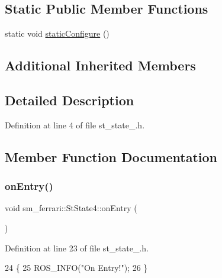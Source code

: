 \subsection*{Static Public Member Functions}
\begin{DoxyCompactItemize}
\item 
static void \hyperlink{structsm__ferrari_1_1StState4_a1b12da24983fb4162bfc1791a91f4fd4}{static\+Configure} ()
\end{DoxyCompactItemize}
\subsection*{Additional Inherited Members}


\subsection{Detailed Description}


Definition at line 4 of file st\+\_\+state\+\_.\+h.



\subsection{Member Function Documentation}
\mbox{\label{structsm__ferrari_1_1StState4_a03b9f1557aada256d6c5ce4a241ca8a6}} 
\subsubsection{\texorpdfstring{on\+Entry()}{onEntry()}}
{\footnotesize\ttfamily void sm\+\_\+ferrari\+::\+St\+State4\+::on\+Entry (\begin{DoxyParamCaption}{ }\end{DoxyParamCaption})\hspace{0.3cm}{\ttfamily [inline]}}



Definition at line 23 of file st\+\_\+state\+\_.\+h.


\begin{DoxyCode}
24     \{
25         ROS\_INFO(\textcolor{stringliteral}{"On Entry!"});
26     \}
\end{DoxyCode}
\mbox{\label{structsm__ferrari_1_1StState4_a43f0a1d52ab541edbb4ab599e2492be6}} 
